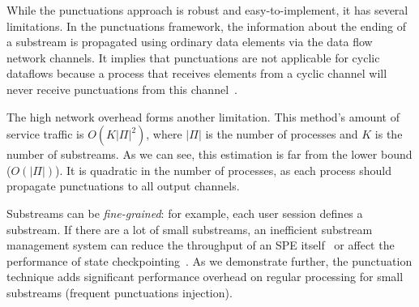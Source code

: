 While the punctuations approach is robust and easy-to-implement, it has several limitations. In the punctuations framework, the information about the ending of a substream is propagated using ordinary data elements via the data flow network channels. It implies that punctuations are not applicable for cyclic dataflows because a process that receives elements from a cyclic channel will never receive punctuations from this channel~\cite{carbone2018scalable}.

The high network overhead forms another limitation. This method's amount of service traffic is $O(K|\Pi|^2)$, where $|\Pi|$ is the number of processes and $K$ is the number of substreams. As we can see, this estimation is far from the lower bound ($O(|\Pi|)$). It is quadratic in the number of processes, as each process should propagate punctuations to all output channels. 

Substreams can be {\em fine-grained}: for example, each user session defines a substream. If there are a lot of small substreams, an inefficient substream management system can reduce the throughput of an SPE itself~\cite{Li:2008:OPN:1453856.1453890} or affect the performance of state checkpointing~\cite{zhang2021research}. As we demonstrate further, the punctuation technique adds significant performance overhead on regular processing for small substreams (frequent punctuations injection).